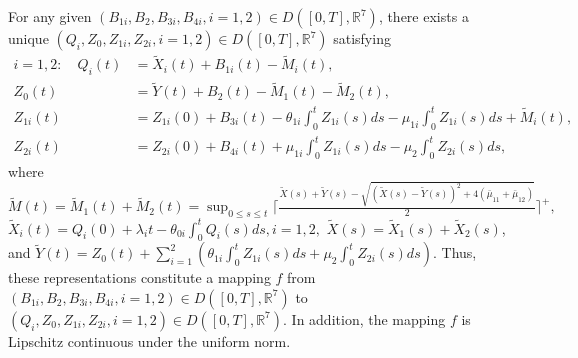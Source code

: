 \begin{proposition} \label{prop:EC1}
For any given $(B_{1i}, B_2, B_{3i}, B_{4i}, i =1,2) \in D([0, T], \mathbb{R}^7)$, there exists a unique 
$(Q_i, Z_0, Z_{1i}, Z_{2i}, i=1,2) \in D([0, T], \mathbb{R}^7)$ satisfying
\begin{align}
    i = 1,2: \quad
Q_i(t) &= \tilde{X}_i(t) + B_{1i}(t) - \tilde{M}_{i}(t), \label{eq:EC39} \\
Z_0(t) &= \tilde{Y}(t) + B_2(t) - \tilde{M}_{1}(t)-\tilde{M}_{2}(t), \label{eq:EC40} \\
Z_{1i}(t) &= Z_{1i}(0) + B_{3i}(t) - \theta_{1i} \int_0^t Z_{1i}(s)ds - \mu_{1i} \int_0^t Z_{1i}(s)ds + \tilde{M}_{i}(t), \label{eq:EC41} \\
Z_{2i}(t) &= Z_{2i}(0) + B_{4i}(t) + \mu_{1i} \int_0^t Z_{1i}(s)ds - \mu_2 \int_0^t Z_{2i}(s)ds, \label{eq:EC42}
\end{align}
where $\tilde{M}(t)= \tilde{M}_1(t)+\tilde{M}_2(t) = \sup_{0 \le s \le t} \lceil{\frac{\tilde{X}(s) + \tilde{Y}(s) - \sqrt{(\tilde{X}(s) - \tilde{Y}(s))^2 + 4(\bar{\mu}_{11}+\bar{\mu}_{12})}}{2}}\rceil^+,$
$\tilde{X}_i(t) = Q_i(0) + \lambda_i t - \theta_{0i} \int_0^t Q_i(s)ds, i=1,2,$ $\tilde{X}(s) = \tilde{X}_1(s)+\tilde{X}_2(s)$,
and $\tilde{Y}(t) = Z_0(t) + \sum_{i=1}^{2}(\theta_{1i} \int_0^t Z_{1i}(s)ds + \mu_2 \int_0^t Z_{2i}(s)ds).$ 
Thus, these representations constitute a mapping $f$ from $(B_{1i}, B_2, B_{3i}, B_{4i},i=1,2) \in D([0, T], \mathbb{R}^7)$ 
to $(Q_i, Z_0, Z_{1i}, Z_{2i},i=1,2) \in D([0, T], \mathbb{R}^7)$. In addition, the mapping $f$ is Lipschitz continuous under the uniform norm.
\end{proposition}

